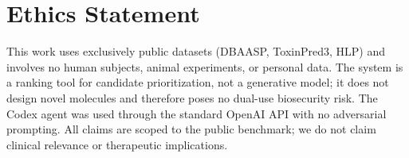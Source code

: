 \section{Ethics Statement}
\label{sec:ethics}

This work uses exclusively public datasets (DBAASP, ToxinPred3, HLP) and involves no human subjects, animal experiments, or personal data.
The system is a ranking tool for candidate prioritization, not a generative model; it does not design novel molecules and therefore poses no dual-use biosecurity risk.
The Codex agent was used through the standard OpenAI API with no adversarial prompting.
All claims are scoped to the public benchmark; we do not claim clinical relevance or therapeutic implications.
